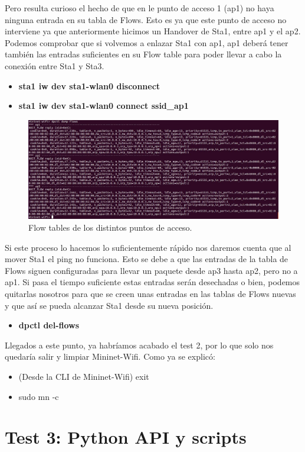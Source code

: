Pero resulta curioso el hecho de que en le punto de acceso 1 (ap1) no haya ninguna entrada en su tabla de Flows. Esto es ya que este punto de acceso no interviene ya que anteriormente hicimos un Handover de Sta1, entre ap1 y el ap2. Podemos comprobar que si volvemos a enlazar Sta1 con ap1, ap1 deberá tener también las entradas suficientes en su Flow table para poder llevar a cabo la conexión entre Sta1 y Sta3. 
\begin{itemize}
    \item \textbf{sta1 iw dev sta1-wlan0 disconnect} 
    \item \textbf{sta1 iw dev sta1-wlan0 connect ssid\_ap1}
\end{itemize}
\begin{figure}[!htb]
  \centering
    \includegraphics[width=0.9\linewidth]{./img/18.JPG}
    \caption{Flow tables de los distintos puntos de acceso.}
  \label{fig:yo}
\end{figure}
\newpage
Si este proceso lo hacemos lo suficientemente rápido nos daremos cuenta que al mover Sta1 el ping no funciona. Esto se debe a que las entradas de la tabla de Flows siguen configuradas para llevar un paquete desde ap3 hasta ap2, pero no a ap1. Si pasa el tiempo suficiente estas entradas serán desechadas o bien, podemos quitarlas nosotros para que se creen unas entradas en las tablas de Flows nuevas y que así se pueda alcanzar Sta1 desde su nueva posición.
\begin{itemize}
    \item \textbf{dpctl del-flows}
\end{itemize}
Llegados a este punto, ya habríamos acabado el test 2, por lo que solo nos quedaría salir y limpiar Mininet-Wifi. Como ya se explicó:

\begin{itemize}
    \item (Desde la CLI de Mininet-Wifi) exit
    \item  sudo mn -c
\end{itemize}
\newpage
\section{Test 3: Python API y scripts}

